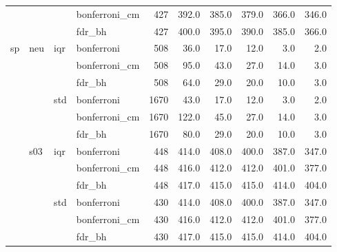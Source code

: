 \documentclass[11pt]{article}
\begin{document}
\begin{table}
\begin{tabular}{llllrrrrrr}
		                        &                         &                         & bonferroni\_cm & 427    & 392.0 & 385.0 & 379.0 & 366.0 & 346.0 \\
		                        &                         &                         & fdr\_bh        & 427    & 400.0 & 395.0 & 390.0 & 385.0 & 366.0 \\
		\cline{4-10}
		\multirow[t]{12}{*}{sp} & \multirow[t]{6}{*}{neu} & \multirow[t]{3}{*}{iqr} & bonferroni     & 508    & 36.0  & 17.0  & 12.0  & 3.0   & 2.0   \\
		                        &                         &                         & bonferroni\_cm & 508    & 95.0  & 43.0  & 27.0  & 14.0  & 3.0   \\
		                        &                         &                         & fdr\_bh        & 508    & 64.0  & 29.0  & 20.0  & 10.0  & 3.0   \\
		\cline{4-10}
		                        &                         & \multirow[t]{3}{*}{std} & bonferroni     & 1670   & 43.0  & 17.0  & 12.0  & 3.0   & 2.0   \\
		                        &                         &                         & bonferroni\_cm & 1670   & 122.0 & 45.0  & 27.0  & 14.0  & 3.0   \\
		                        &                         &                         & fdr\_bh        & 1670   & 80.0  & 29.0  & 20.0  & 10.0  & 3.0   \\
		\cline{4-10}
		                        & \multirow[t]{6}{*}{s03} & \multirow[t]{3}{*}{iqr} & bonferroni     & 448    & 414.0 & 408.0 & 400.0 & 387.0 & 347.0 \\
		                        &                         &                         & bonferroni\_cm & 448    & 416.0 & 412.0 & 412.0 & 401.0 & 377.0 \\
		                        &                         &                         & fdr\_bh        & 448    & 417.0 & 415.0 & 415.0 & 414.0 & 404.0 \\
		\cline{4-10}
		                        &                         & \multirow[t]{3}{*}{std} & bonferroni     & 430    & 414.0 & 408.0 & 400.0 & 387.0 & 347.0 \\
		                        &                         &                         & bonferroni\_cm & 430    & 416.0 & 412.0 & 412.0 & 401.0 & 377.0 \\
		                        &                         &                         & fdr\_bh        & 430    & 417.0 & 415.0 & 415.0 & 414.0 & 404.0 \\
		\hline
		\hline
	\end{tabular}
	\label{tab:peak_id_filt_meth}

\end{table}
\end{document}
